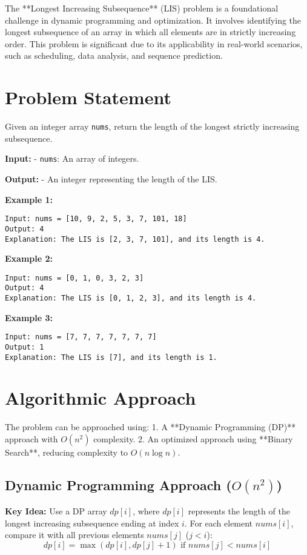 
\label{problem:Longest_Increasing_Subsequence}

The **Longest Increasing Subsequence** (LIS) problem is a foundational challenge in dynamic programming and optimization. It involves identifying the longest subsequence of an array in which all elements are in strictly increasing order. This problem is significant due to its applicability in real-world scenarios, such as scheduling, data analysis, and sequence prediction.

\section*{Problem Statement}
Given an integer array \texttt{nums}, return the length of the longest strictly increasing subsequence.

\textbf{Input:}
- \texttt{nums}: An array of integers.

\textbf{Output:}
- An integer representing the length of the LIS.

\textbf{Example 1:}
\begin{verbatim}
Input: nums = [10, 9, 2, 5, 3, 7, 101, 18]
Output: 4
Explanation: The LIS is [2, 3, 7, 101], and its length is 4.
\end{verbatim}

\textbf{Example 2:}
\begin{verbatim}
Input: nums = [0, 1, 0, 3, 2, 3]
Output: 4
Explanation: The LIS is [0, 1, 2, 3], and its length is 4.
\end{verbatim}

\textbf{Example 3:}
\begin{verbatim}
Input: nums = [7, 7, 7, 7, 7, 7, 7]
Output: 1
Explanation: The LIS is [7], and its length is 1.
\end{verbatim}

\section*{Algorithmic Approach}
The problem can be approached using:
1. A **Dynamic Programming (DP)** approach with \(O(n^2)\) complexity.
2. An optimized approach using **Binary Search**, reducing complexity to \(O(n \log n)\).

\subsection*{Dynamic Programming Approach (\(O(n^2)\))}
\textbf{Key Idea:}
Use a DP array \(dp[i]\), where \(dp[i]\) represents the length of the longest increasing subsequence ending at index \(i\). For each element \(nums[i]\), compare it with all previous elements \(nums[j]\) (\(j < i\)):
\[
dp[i] = \max(dp[i], dp[j] + 1) \text{ if } nums[j] < nums[i]
\]

